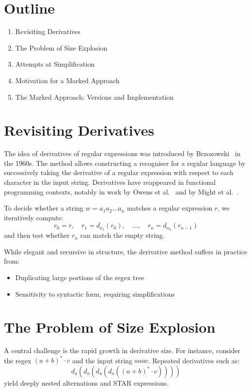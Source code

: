 \documentclass[11pt]{article}
\begin{document}
\section*{Outline}

\begin{enumerate}
\item Revisiting Derivatives
\item The Problem of Size Explosion
\item Attempts at Simplification
\item Motivation for a Marked Approach
\item The Marked Approach: Versions and Implementation
\end{enumerate}

\section{Revisiting Derivatives}
The idea of derivatives of regular expressions was introduced by Brzozowski~\cite{Brzozowski1964} in the 1960s. The method allows constructing a recogniser for a regular language by successively taking the derivative of a regular expression with respect to each character in the input string. Derivatives have reappeared in functional programming contexts, notably in work by Owens et al.~\cite{Owens2009} and by Might et al.~\cite{Might2011}.

To decide whether a string $w = a_1a_2\dots a_n$ matches a regular expression $r$, we iteratively compute:
\[
r_0 = r,\quad r_1 = d_{a_1}(r_0),\quad \dots,\quad r_n = d_{a_n}(r_{n-1})
\]
and then test whether $r_n$ can match the empty string.

While elegant and recursive in structure, the derivative method suffers in practice from:
\begin{itemize}
\item Duplicating large portions of the regex tree
\item Sensitivity to syntactic form, requiring simplifications
\end{itemize}

\section{The Problem of Size Explosion}
A central challenge is the rapid growth in derivative size. For instance, consider the regex $(a + b)^* \cdot c$ and the input string $aaac$. Repeated derivatives such as:
\[
d_a(d_a(d_a(d_a((a + b)^* \cdot c))))
\]
yield deeply nested alternations and STAR expressions.
\end{document}
